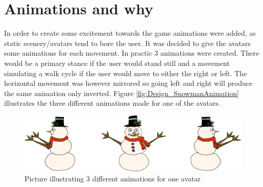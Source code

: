 
\section{Animations and why}
In order to create some excitement towards the game animations were added, as static scenery/avatars tend to bore the user. It was decided to give the avatars some animations for each movement. In practic 3 animations were created. There would be a primary stance if the user would stand still and a movement simulating a walk cycle if the user would move to either the right or left. The horizontal movement was however mirrored so going left and right will produce the same animation only inverted.
Figure \eqref{fig:Design_SnowmanAnimation} illustrates the three different animations made for one of the avatars.
\begin{figure}[htbp]
\centering
\includegraphics[width=1.00\textwidth]{Pictures/Design/SnowManShowOff.png}
\caption{Picture illustrating 3 different animations for one avatar}
\label{fig:Design_SnowmanAnimation}
\end{figure} 
